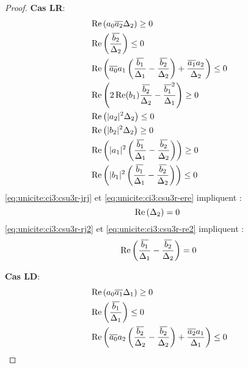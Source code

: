 \begin{proof}
    \begin{minipage}{0.49\textwidth}
      \textbf{Cas LR}:
      \begin{align}
        \label{eq:unicite:ci3:csu3r-j2}&\Re\left(a_0\conj{a_2}\Delta_2\right) \ge 0 \\
        \label{eq:unicite:ci3:csu3r-e2}&\Re\left(\frac{\conj{b_2}}{\Delta_2}\right) \le 0 \\
        \label{eq:unicite:ci3:csu3r-jdj}&\Re\left(\conj{a_0}a_1\left(\frac{\conj{b_1}}{\Delta_1}-\frac{\conj{b_2}}{\Delta_2}\right) + \frac{\conj{a_1}a_2}{\Delta_2} \right)\le 0\\
        \label{eq:unicite:ci3:csu3r-ede}&\Re\left(2\Re(b_1)\frac{\conj{b_2}}{\Delta_2}-\frac{\conj{b_1}^2}{\Delta_1}\right) \ge 0\\
        \label{eq:unicite:ci3:csu3r-jrj}&\Re\left(|a_2|^2\Delta_2\right) \le 0 \\
        \label{eq:unicite:ci3:csu3r-ere}&\Re\left(|b_2|^2\Delta_2\right) \ge 0 \\
        \label{eq:unicite:ci3:csu3r-rj2}&\Re\left(|a_1|^2\left(\frac{\conj{b_1}}{\Delta_1}-\frac{\conj{b_2}}{\Delta_2}\right)\right)\ge 0\\
        \label{eq:unicite:ci3:csu3r-re2}&\Re\left(|b_1|^2\left(\frac{\conj{b_1}}{\Delta_1}-\frac{\conj{b_2}}{\Delta_2}\right)\right)\le 0
      \end{align}
      \eqref{eq:unicite:ci3:csu3r-jrj} et \eqref{eq:unicite:ci3:csu3r-ere} impliquent :
      \begin{equation}
        \Re\left(\Delta_2\right) = 0\\\
      \end{equation}
      \eqref{eq:unicite:ci3:csu3r-rj2} et \eqref{eq:unicite:ci3:csu3r-re2} impliquent :
      \begin{equation}
        \Re\left(\frac{\conj{b_1}}{\Delta_1}-\frac{\conj{b_2}}{\Delta_2}\right) = 0
      \end{equation}
    \end{minipage}
    \begin{minipage}{0.49\textwidth}
      \textbf{Cas LD}:
      \begin{align}
        \label{eq:unicite:ci3:csu3d-j2}&\Re\left(a_0\conj{a_1}\Delta_1\right) \ge 0 \\
        \label{eq:unicite:ci3:csu3d-e2}&\Re\left(\frac{\conj{b_1}}{\Delta_1}\right) \le 0 \\
        \label{eq:unicite:ci3:csu3d-jrj}&\Re\left(\conj{a_0}a_2\left(\frac{\conj{b_2}}{\Delta_2}-\frac{\conj{b_2}}{\Delta_2}\right) + \frac{\conj{a_2}a_1}{\Delta_1} \right)\le 0\\

\end{align}
\end{minipage}
\end{proof}
